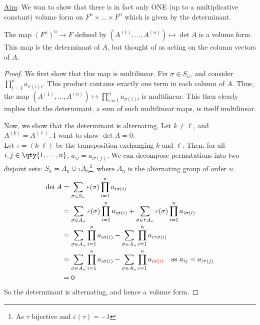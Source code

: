\underline{Aim}: We wan to show that there is in fact only ONE (up to a multiplicative constant) volume form on $F^n \times \dots \times F^n$ which is given by the determinant.

\begin{lemma}
	The map $(F^n)^n \to F$ defined by $(A^{(1)}, \dots, A^{(n)}) \mapsto \det A$ is a volume form.
	This map is the determinant of $A$, but thought of as acting on the column vectors of $A$.
\end{lemma}
\begin{proof}
	We first show that this map is multilinear.
	Fix $\sigma \in S_n$, and consider $\prod_{i=1}^n a_{\sigma(i) i}$.
	This product contains exactly one term in each column of $A$.
	Thus, the map $(A^{(1)}, \dots, A^{(n)}) \mapsto \prod_{i=1}^n a_{\sigma(i) i}$ is multilinear.
	This then clearly implies that the determinant, a sum of such multilinear maps, is itself multilinear.

	Now, we show that the determinant is alternating.
	Let $k \neq \ell$, and $A^{(k)} = A^{(\ell)}$.
	I want to show $\det A = 0$. \\
	Let $\tau = ( k \; \ell )$ be the transposition exchanging $k$ and $\ell$.
	Then, for all $i, j \in \qty{1, \dots, n}$, $a_{ij} = a_{i \tau(j)}$.
	We can decompose permutations into two disjoint sets: $S_n = A_n \cup \tau A_n$\footnote{As $\tau$ bijective and $\varepsilon(\tau) = -1$}, where $A_n$ is the alternating group of order $n$.
	\begin{align*}
		\det A &= \sum_{\sigma \in S_n} \varepsilon(\sigma) \prod_{i = 1}^n a_{i \sigma(i)} \\
		&= \sum_{\sigma\in A_n} \varepsilon(\sigma) \prod_{i = 1}^n a_{i \sigma(i)} + \sum_{\sigma \in \tau A_n} \varepsilon(\sigma) \prod_{i = 1}^n a_{i \sigma(i)} \\
		&= \sum_{\sigma\in A_n} \prod_{i = 1}^n a_{i \sigma(i)} - \sum_{\sigma\in A_n} \prod_{i = 1}^n a_{i \tau\sigma(i)} \\
		&= \sum_{\sigma\in A_n} \prod_{i = 1}^n a_{i \sigma(i)} - \sum_{\sigma\in A_n} \prod_{i = 1}^n a_{i \mathcolor{red}{\sigma(i)}} \quad \text{as $a_{ij} = a_{i \tau(j)}$} \\
		&= 0
	\end{align*} 
	So the determinant is alternating, and hence a volume form.
\end{proof}

